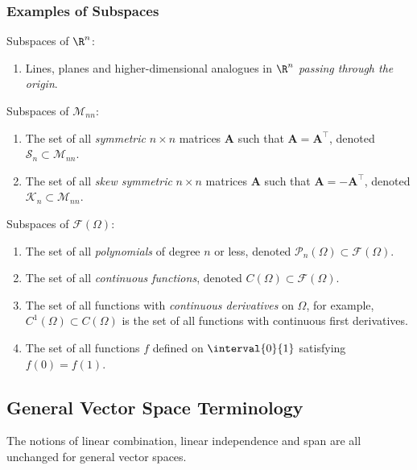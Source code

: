 \documentclass{article}
\begin{document}
\subsubsection{Examples of Subspaces}
Subspaces of \(\R^n\):
\begin{enumerate}
    \item Lines, planes and higher-dimensional analogues in \(\R^n\) \emph{passing through the origin}.
\end{enumerate}
Subspaces of \(\mathscr{M}_{nn}\):
\begin{enumerate}
    \item The set of all \emph{symmetric} \(n \times n\) matrices \(\symbf{A}\) such that \(\symbf{A} = \symbf{A}^\top\), denoted \(\mathscr{S}_n \subset \mathscr{M}_{nn}\).
    \item The set of all \emph{skew symmetric} \(n \times n\) matrices \(\symbf{A}\) such that \(\symbf{A} = -\symbf{A}^\top\), denoted \(\mathscr{K}_n \subset \mathscr{M}_{nn}\).
\end{enumerate}
Subspaces of \(\mathscr{F}\left( \Omega \right)\):
\begin{enumerate}
    \item The set of all \emph{polynomials} of degree \(n\) or less, denoted \(\mathscr{P}_n\left( \Omega \right) \subset \mathscr{F}\left( \Omega \right)\).
    \item The set of all \emph{continuous functions}, denoted \(C\left( \Omega \right) \subset \mathscr{F}\left( \Omega \right)\).
    \item The set of all functions with \emph{continuous derivatives} on \(\Omega\), for example, \(C^1\left( \Omega \right) \subset C\left( \Omega \right)\)
          is the set of all functions with continuous first derivatives.
    \item The set of all functions \(f\) defined on \(\interval{0}{1}\) satisfying \(f\left( 0 \right) = f\left( 1 \right)\).
\end{enumerate}
\subsection{General Vector Space Terminology}
The notions of linear combination, linear independence and span are all unchanged for general vector spaces.
\end{document}
